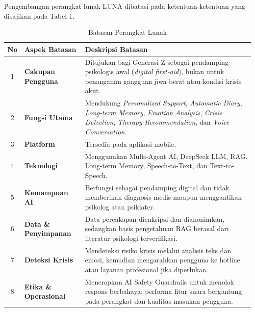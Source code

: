 
Pengembangan perangkat lunak LUNA dibatasi pada ketentuan-ketentuan yang disajikan pada Tabel 1.

\begin{table}[H]
\centering
\renewcommand{\arraystretch}{1.35}
\renewcommand{\tabularxcolumn}[1]{m{#1}}
\caption{Batasan Perangkat Lunak}
\vspace{0.3em}
\small
\begin{tabularx}{\textwidth}{| c | >{\bfseries}l | X |}
\hline
\rowcolor{TableHeaderPurple}
\color{white}\bfseries No & \color{white}\bfseries Aspek Batasan & \color{white}\bfseries Deskripsi Batasan \\
\hline
1 & Cakupan Pengguna & Ditujukan bagi Generasi Z sebagai pendamping psikologis awal (\textit{digital first-aid}), bukan untuk penanganan gangguan jiwa berat atau kondisi krisis akut. \\
\hline
\rowcolor{TableAltRowBg}
2 & Fungsi Utama & Mendukung \textit{Personalized Support}, \textit{Automatic Diary}, \textit{Long-term Memory}, \textit{Emotion Analysis}, \textit{Crisis Detection}, \textit{Therapy Recommendation}, dan \textit{Voice Conversation}. \\
\hline
3 & Platform & Tersedia pada aplikasi mobile. \\
\hline
\rowcolor{TableAltRowBg}
4 & Teknologi & Menggunakan Multi-Agent AI, DeepSeek LLM, RAG, Long-term Memory, Speech-to-Text, dan Text-to-Speech. \\
\hline
5 & Kemampuan AI & Berfungsi sebagai pendamping digital dan tidak memberikan diagnosis medis maupun menggantikan psikolog atau psikiater. \\
\hline
\rowcolor{TableAltRowBg}
6 & Data \& Penyimpanan & Data percakapan dienkripsi dan dianonimkan, sedangkan basis pengetahuan RAG berasal dari literatur psikologi terverifikasi. \\
\hline
7 & Deteksi Krisis & Mendeteksi risiko krisis melalui analisis teks dan emosi, kemudian mengarahkan pengguna ke hotline atau layanan profesional jika diperlukan. \\
\hline
\rowcolor{TableAltRowBg}
8 & Etika \& Operasional & Menerapkan AI Safety Guardrails untuk menolak respons berbahaya; performa fitur suara bergantung pada perangkat dan kualitas masukan pengguna. \\
\hline
\end{tabularx}
\end{table}
